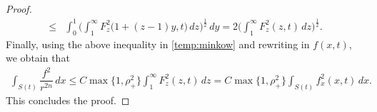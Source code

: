 \documentclass[10pt,a4paper]{amsart}
\begin{document}
\begin{proof}
\begin{align*}
         \le & \int_{0}^1 \bigg( \int_{1}^{\infty} \!  F_z^2 \big( 1+(z-1)y , t \big)\, dz \bigg)^{\frac{1}{2}}\, d y
         = 2 \bigg(\int_{1}^{\infty}\!\! F_z^2(z,t)\, dz \bigg)^{\frac{1}{2}}.
    \end{align*}
    Finally, using the above inequality in \eqref{temp:minkow} and rewriting in $f(x,t)$, we obtain that
    \begin{align*}
        \int_{S(t)} \dfrac{f^2}{r^{2n}} \, dx 
        \le C \max\{1,\rho_{+}^2\} \int_{1}^{\infty} \!\!F_{z}^2 (z,t)\, dz = C  \max\{1,\rho_{+}^2\} \int_{S(t)}\! f_x^2(x,t)\, dx.
    \end{align*}
    This concludes the proof.
\end{proof}
\end{document}
